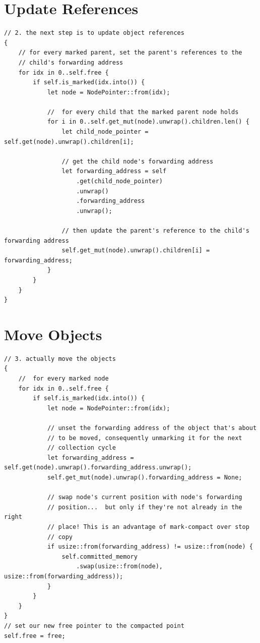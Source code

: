 \documentclass[index]{subfiles}
\begin{document}
\section{Update References}
\begin{verbatim}
// 2. the next step is to update object references
{
    // for every marked parent, set the parent's references to the
    // child's forwarding address
    for idx in 0..self.free {
        if self.is_marked(idx.into()) {
            let node = NodePointer::from(idx);

            //  for every child that the marked parent node holds
            for i in 0..self.get_mut(node).unwrap().children.len() {
                let child_node_pointer = self.get(node).unwrap().children[i];

                // get the child node's forwarding address
                let forwarding_address = self
                    .get(child_node_pointer)
                    .unwrap()
                    .forwarding_address
                    .unwrap();

                // then update the parent's reference to the child's forwarding address
                self.get_mut(node).unwrap().children[i] = forwarding_address;
            }
        }
    }
}
\end{verbatim}
\section{Move Objects}
\begin{verbatim}
// 3. actually move the objects
{
    //  for every marked node
    for idx in 0..self.free {
        if self.is_marked(idx.into()) {
            let node = NodePointer::from(idx);

            // unset the forwarding address of the object that's about
            // to be moved, consequently unmarking it for the next
            // collection cycle
            let forwarding_address = self.get(node).unwrap().forwarding_address.unwrap();
            self.get_mut(node).unwrap().forwarding_address = None;

            // swap node's current position with node's forwarding
            // position...  but only if they're not already in the right
            // place! This is an advantage of mark-compact over stop
            // copy
            if usize::from(forwarding_address) != usize::from(node) {
                self.committed_memory
                    .swap(usize::from(node), usize::from(forwarding_address));
            }
        }
    }
}
// set our new free pointer to the compacted point
self.free = free;
\end{verbatim}
\end{document}
